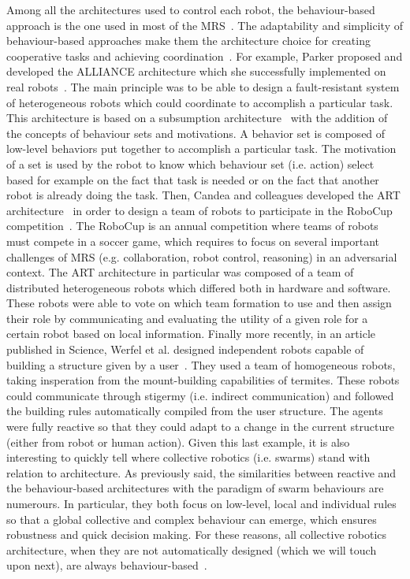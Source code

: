     Among all the architectures used to control each robot, the behaviour-based approach is the one used in most of the MRS~\parencite{Arkin1998, Mataric2008, Parker2008}. The adaptability and simplicity of behaviour-based approaches make them the architecture choice for creating cooperative tasks and achieving coordination~\parencite{Mataric1995, Iocchi2001}. For example, Parker proposed and developed the ALLIANCE architecture which she successfully implemented on real robots~\parencite{Parker1994}. The main principle was to be able to design a fault-resistant system of heterogeneous robots which could coordinate to accomplish a particular task. This architecture is based on a subsumption architecture~\parencite{Brooks1986} with the addition of the concepts of behaviour sets and motivations. A behavior set is composed of low-level behaviors put together to accomplish a particular task. The motivation of a set is used by the robot to know which behaviour set (i.e. action) select based for example on the fact that task is needed or on the fact that another robot is already doing the task. Then, Candea and colleagues developed the ART architecture~\parencite{Candea2001} in order to design a team of robots to participate in the RoboCup competition~\parencite{Kitano1997}. The RoboCup is an annual competition where teams of robots must compete in a soccer game, which requires to focus on several important challenges of MRS (e.g. collaboration, robot control, reasoning) in an adversarial context. The ART architecture in particular was composed of a team of distributed heterogeneous robots which differed both in hardware and software. These robots were able to vote on which team formation to use and then assign their role by communicating and evaluating the utility of a given role for a certain robot based on local information. Finally more recently, in an article published in Science, Werfel et al. designed independent robots capable of building a structure given by a user~\parencite{Werfel2014}. They used a team of homogeneous robots, taking insperation from the mount-building capabilities of termites. These robots could communicate through stigermy (i.e. indirect communication) and followed the building rules automatically compiled from the user structure. The agents were fully reactive so that they could adapt to a change in the current structure (either from robot or human action). Given this last example, it is also interesting to quickly tell where collective robotics (i.e. swarms) stand with relation to architecture. As previously said, the similarities between reactive and the behaviour-based architectures with the paradigm of swarm behaviours are numerours. In particular, they both focus on low-level, local and individual rules so that a global collective and complex behaviour can emerge, which ensures robustness and quick decision making. For these reasons, all collective robotics architecture, when they are not automatically designed (which we will touch upon next), are always behaviour-based~\parencite{Brambilla2012, Zoghby2013}.


